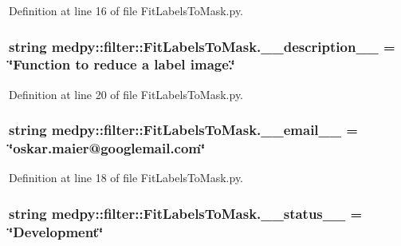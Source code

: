 Definition at line 16 of file FitLabelsToMask.py.

\hypertarget{namespacemedpy_1_1filter_1_1FitLabelsToMask_ae5c7315609bfb89fea11b766377a9568}{
\subsubsection[{\_\-\_\-description\_\-\_\-}]{\setlength{\rightskip}{0pt plus 5cm}string {\bf medpy::filter::FitLabelsToMask.\_\-\_\-description\_\-\_\-} = \char`\"{}Function to reduce a label image.\char`\"{}}}
\label{namespacemedpy_1_1filter_1_1FitLabelsToMask_ae5c7315609bfb89fea11b766377a9568}


Definition at line 20 of file FitLabelsToMask.py.

\hypertarget{namespacemedpy_1_1filter_1_1FitLabelsToMask_afae1d23917541703be77c64e12902f3e}{
\subsubsection[{\_\-\_\-email\_\-\_\-}]{\setlength{\rightskip}{0pt plus 5cm}string {\bf medpy::filter::FitLabelsToMask.\_\-\_\-email\_\-\_\-} = \char`\"{}oskar.maier@googlemail.com\char`\"{}}}
\label{namespacemedpy_1_1filter_1_1FitLabelsToMask_afae1d23917541703be77c64e12902f3e}


Definition at line 18 of file FitLabelsToMask.py.

\hypertarget{namespacemedpy_1_1filter_1_1FitLabelsToMask_a6f6e618d04ee0cddebee953d93787ddc}{
\subsubsection[{\_\-\_\-status\_\-\_\-}]{\setlength{\rightskip}{0pt plus 5cm}string {\bf medpy::filter::FitLabelsToMask.\_\-\_\-status\_\-\_\-} = \char`\"{}Development\char`\"{}}}
\label{namespacemedpy_1_1filter_1_1FitLabelsToMask_a6f6e618d04ee0cddebee953d93787ddc}


